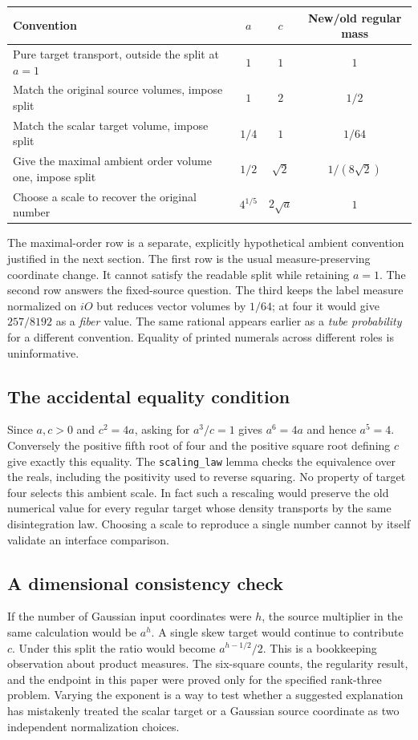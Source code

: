 \documentclass[12pt,letterpaper]{article}
\newcommand{\id}[1]{{\small\nolinkurl{#1}}}
\begin{document}
\begin{center}\small\begin{tabular}{@{}lccc@{}}\toprule
Convention & $a$ & $c$ & New/old regular mass\\\midrule
Pure target transport, outside the split at $a=1$ & $1$ & $1$ & $1$\\
Match the original source volumes, impose split & $1$ & $2$ & $1/2$\\
Match the scalar target volume, impose split & $1/4$ & $1$ & $1/64$\\
Give the maximal ambient order volume one, impose split & $1/2$ & $\sqrt2$ & $1/(8\sqrt2)$\\
Choose a scale to recover the original number & $4^{1/5}$ & $2\sqrt a$ & $1$\\\bottomrule
\end{tabular}\end{center}
The maximal-order row is a separate, explicitly hypothetical ambient convention justified in the next section. The first row is the usual measure-preserving coordinate change. It cannot satisfy the readable split while retaining $a=1$. The second row answers the fixed-source question. The third keeps the label measure normalized on $iO$ but reduces vector volumes by $1/64$; at four it would give $257/8192$ as a \emph{fiber} value. The same rational appears earlier as a \emph{tube probability} for a different convention. Equality of printed numerals across different roles is uninformative.

\subsection{The accidental equality condition}
Since $a,c>0$ and $c^2=4a$, asking for $a^3/c=1$ gives $a^6=4a$ and hence $a^5=4$. Conversely the positive fifth root of four and the positive square root defining $c$ give exactly this equality. The \id{scaling_law} lemma checks the equivalence over the reals, including the positivity used to reverse squaring. No property of target four selects this ambient scale. In fact such a rescaling would preserve the old numerical value for every regular target whose density transports by the same disintegration law. Choosing a scale to reproduce a single number cannot by itself validate an interface comparison.

\subsection{A dimensional consistency check}
If the number of Gaussian input coordinates were $h$, the source multiplier in the same calculation would be $a^h$. A single skew target would continue to contribute $c$. Under this split the ratio would become $a^{h-1/2}/2$. This is a bookkeeping observation about product measures. The six-square counts, the regularity result, and the endpoint in this paper were proved only for the specified rank-three problem. Varying the exponent is a way to test whether a suggested explanation has mistakenly treated the scalar target or a Gaussian source coordinate as two independent normalization choices.
\end{document}
